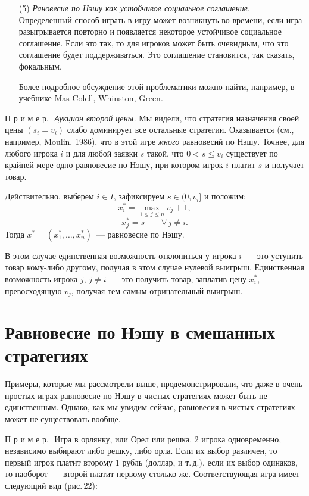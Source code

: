 {\begin{itemize}
\item[(5)] {\it Рановесие по Нэшу  как устойчивое социальное
соглашение}.  Определенный способ играть в игру может возникнуть во
времени, если игра разыгрывается повторно и появляется некоторое
устойчивое социальное соглашение. Если это так, то для игроков может
быть очевидным, что это соглашение будет поддерживаться. Это
соглашение становится, так сказать, фокальным.

Более подробное обсуждение этой проблематики можно найти, например,
в учебнике Mas-Colell, Whinston, Green. \end{itemize}
\smallskip

П р и м е р.\,\, {\it Аукцион второй цены.} Мы видели, что стратегия
назначения своей цены $(s_i=v_i)$ слабо доминирует все остальные
стратегии. Оказывается (см., например, Moulin, 1986), что в этой
игре {\it много} равновесий по Нэшу. Точнее, для любого игрока $i$ и
для любой заявки $s$ такой, что $0<s\leq v_i$ существует по крайней
мере одно равновесие по Нэшу, при котором игрок $i$ платит $s$ и
получает товар.

Действительно, выберем $i\in I$, зафиксируем $s\in(0,v_i]$ и
положим:
$$
x^*_i=\max_{1\leq j\leq n} v_j+1,
$$
$$
x^*_j=s\qquad \forall\, j\ne i.
$$
Тогда $x^*=(x^*_1,\ldots,x^*_n)$~--- равновесие по Нэшу.

В этом случае единственная возможность отклониться у игрока $i$~---
это уступить товар кому-либо другому, получая в этом случае нулевой
выигрыш. Единственная возможность игрока $j$, $j\ne i$~--- это
получить товар, заплатив цену $x^*_i$, превосходящую $v_j$, получая
тем самым отрицательный выигрыш.

\section{Равновесие по Нэшу в смешанных стратегиях}

Примеры, которые мы рассмотрели выше, продемонстрировали, что даже в
очень простых играх равновесие по Нэшу в чистых стратегиях может
быть не единственным.  Однако, как мы увидим сейчас, равновесия в
чистых стратегиях может не существовать вообще.
\smallskip

П р и м е р.\,\, Игра в орлянку, или Орел или решка. 2 игрока
одновременно, независимо выбирают либо решку, либо орла. Если их
выбор различен, то первый игрок платит второму 1 рубль (доллар, и
т.\,д.), если их выбор одинаков, то наоборот~--- второй платит
первому столько же. Соответствующая игра имеет следующий вид
(рис.\,22):

}

